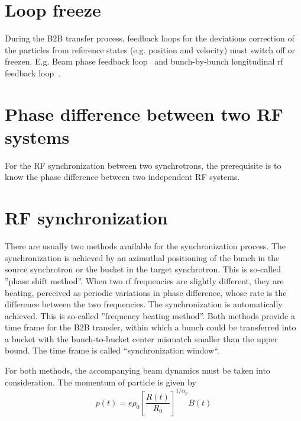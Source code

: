 \section{Loop freeze}

During the B2B transfer process, feedback loops for the deviations correction of the particles from reference states (e.g. position and velocity) must switch off or freezen. E.g. Beam phase feedback loop~\cite{grieser_beam_2015} and bunch-by-bunch longitudinal rf feedback loop~\cite{gross_bunch-by-bunch_2015}.

\section{Phase difference between two RF systems}
\label{sec:phase_diff}
For the RF synchronization between two synchrotrons, the prerequisite is to know the phase difference between two independent RF systems. 
  
\section{RF synchronization}
\label{two_sync_methods}

There are usually two methods available for the synchronization process. The synchronization is achieved by an azimuthal positioning of the bunch in the source synchrotron or the bucket in the target synchrotron. This is so-called ''phase shift method''. When two rf frequencies are slightly different, they are beating, perceived as periodic variations in phase difference, whose rate is the difference between the two frequencies. The synchronization is automatically achieved. This is so-called ''frequency beating method''. Both methods provide a time frame for the B2B transfer, within which a bunch could be transferred into a bucket with the bunch-to-bucket center mismatch smaller than the upper bound. The time frame is called ``synchronization window``. 

For both methods, the accompanying beam dynamics must be taken into consideration. The momentum of particle is given by 
\begin{equation}
\label{eq:momentum}
p(t)=e\rho_0 [\frac {R(t)}{R_0}]^{1/\alpha_p }B(t) 
\end{equation}

